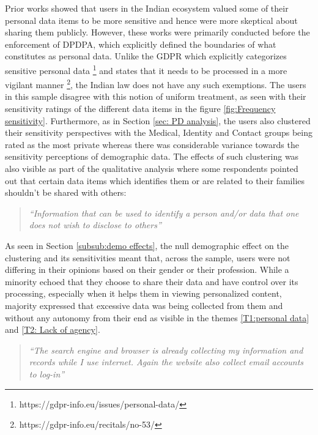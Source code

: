 Prior works \cite{priyadarsini_web_2025, kumaraguru_privacy_2012, danezis_privacy_2006} showed that users in the Indian ecosystem valued some of their personal data items to be more sensitive and hence were more skeptical about sharing them publicly. However, these works were primarily conducted before the enforcement of DPDPA, which explicitly defined the boundaries of what constitutes as personal data. Unlike the GDPR which explicitly categorizes sensitive personal data \footnote{https://gdpr-info.eu/issues/personal-data/} and states that it needs to be processed in a more vigilant manner \footnote{https://gdpr-info.eu/recitals/no-53/}, the Indian law does not have any such exemptions. The users in this sample disagree with this notion of uniform treatment, as seen with their sensitivity ratings of the different data items in the figure \ref{fig:Frequency sensitivity}. Furthermore, as in Section \ref{sec: PD analysis}, the users also clustered their sensitivity perspectives with the Medical, Identity and Contact groups being rated as the most private whereas there was considerable variance towards the sensitivity perceptions of demographic data. The effects of such clustering was also visible as part of the qualitative analysis where some respondents pointed out that certain data items which identifies them or are related to their families shouldn't be shared with others:

\begin{quote}
   \textit{``Information that can be used to identify a person and/or data that one does not wish to disclose to others'' }
\end{quote}

As seen in Section \ref{subsub:demo effects}, the null demographic effect on the clustering and its sensitivities meant that, across the sample, users were not differing in their opinions based on their gender or their profession. While a minority echoed that they choose to share their data and have control over its processing, especially when it helps them in viewing personalized content, majority expressed that excessive data was being collected from them and without any autonomy from their end as visible in the themes \ref{T1:personal data} and \ref{T2: Lack of agency}.

\begin{quote}
    \textit{``The search engine and browser is already collecting my information and records while I use internet. Again the website also collect email accounts to log-in''}
\end{quote}

